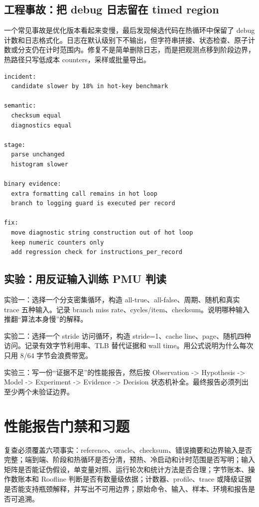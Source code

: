 \subsection{工程事故：把 debug 日志留在 timed region}

一个常见事故是优化版本看起来变慢，最后发现候选代码在热循环中保留了 debug 计数和日志格式化。日志在默认级别下不输出，但字符串拼接、状态检查、原子计数或分支仍在计时范围内。修复不是简单删除日志，而是把观测点移到阶段边界，热路径只写低成本 counters，采样或批量导出。

\begin{lstlisting}[numbers=none,caption={测量事故复盘模板}]
incident:
  candidate slower by 18% in hot-key benchmark

semantic:
  checksum equal
  diagnostics equal

stage:
  parse unchanged
  histogram slower

binary evidence:
  extra formatting call remains in hot loop
  branch to logging guard is executed per record

fix:
  move diagnostic string construction out of hot loop
  keep numeric counters only
  add regression check for instructions_per_record
\end{lstlisting}

\subsection{实验：用反证输入训练 PMU 判读}

\begin{exercisebox}
实验一：选择一个分支密集循环，构造 all-true、all-false、周期、随机和真实 trace 五种输入。记录 branch miss rate、cycles/item、checksum。说明哪种输入推翻“算法本身慢”的解释。

实验二：选择一个 stride 访问循环，构造 stride=1、cache line、page、随机四种访问。记录有效字节利用率、TLB 替代证据和 wall time。用公式说明为什么每次只用 8/64 字节会浪费带宽。

实验三：写一份“证据不足”的性能报告，然后按 Observation -> Hypothesis -> Model -> Experiment -> Evidence -> Decision 状态机补全。最终报告必须列出至少两个未验证边界。
\end{exercisebox}

\section{性能报告门禁和习题}

复查必须覆盖六项事实：reference、oracle、checksum、错误摘要和边界输入是否完整；端到端、阶段和热循环是否分清，预热、冷启动和计时范围是否写明；输入矩阵是否能证伪假设，单变量对照、运行轮次和统计方法是否合理；字节账本、操作数账本和 Roofline 判断是否有数量级依据；计数器、profile、trace 或降级证据是否能支持瓶颈解释，并写出不可用边界；原始命令、输入、样本、环境和报告是否可追溯。

